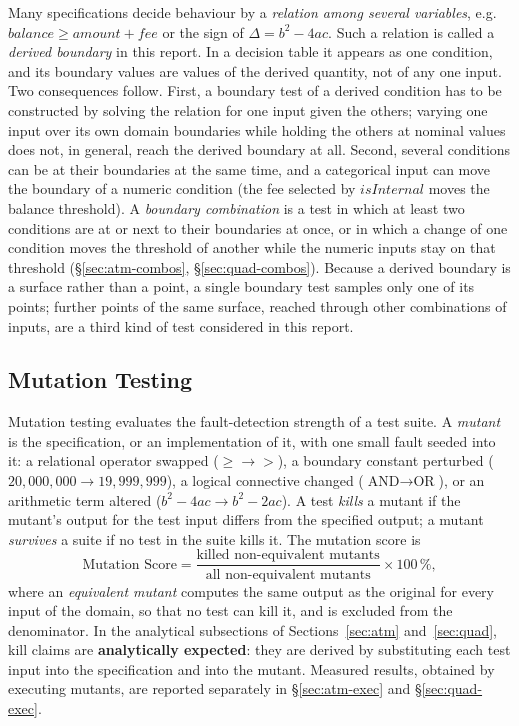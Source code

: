 \documentclass[11pt,a4paper]{article}
\begin{document}
Many specifications decide behaviour by a \emph{relation among several
variables}, e.g.\ \(\mathit{balance}\ge\mathit{amount}+\mathit{fee}\) or the
sign of \(\Delta=b^2-4ac\). Such a relation is called a \emph{derived
boundary} in this report. In a decision table it appears as one condition,
and its boundary values are values of the derived quantity, not of any one
input. Two consequences follow. First, a boundary test of a derived
condition has to be constructed by solving the relation for one input given
the others; varying one input over its own domain boundaries while holding
the others at nominal values does not, in general, reach the derived
boundary at all. Second, several conditions can be at their boundaries at
the same time, and a categorical input can move the boundary of a numeric
condition (the fee selected by \(\mathit{isInternal}\) moves the balance
threshold). A \emph{boundary combination} is a test in which at least two
conditions are at or next to their boundaries at once, or in which a change
of one condition moves the threshold of another while the numeric inputs
stay on that threshold (\S\ref{sec:atm-combos}, \S\ref{sec:quad-combos}).
Because a derived boundary is a surface rather than a point, a single
boundary test samples only one of its points; further points of the same
surface, reached through other combinations of inputs, are a third kind of
test considered in this report.

\subsection{Mutation Testing}
\label{sec:bg-mutation}

Mutation testing \cite{demillo1978,jia2011} evaluates the fault-detection
strength of a test suite. A \emph{mutant} is the specification, or an
implementation of it, with one small fault seeded into it: a relational
operator swapped (\(\ge\to>\)), a boundary constant perturbed
(\(20{,}000{,}000\to19{,}999{,}999\)), a logical connective changed
(\(\text{AND}\to\text{OR}\)), or an arithmetic term altered
(\(b^2-4ac\to b^2-2ac\)). A test \emph{kills} a mutant if the mutant's output
for the test input differs from the specified output; a mutant
\emph{survives} a suite if no test in the suite kills it. The mutation score
is
\[
\text{Mutation Score} = \frac{\text{killed non-equivalent mutants}}
{\text{all non-equivalent mutants}} \times 100\,\%,
\]
where an \emph{equivalent mutant} computes the same output as the original
for every input of the domain, so that no test can kill it, and is excluded
from the denominator. In the analytical subsections of
Sections~\ref{sec:atm} and~\ref{sec:quad}, kill claims are
\textbf{analytically expected}: they are derived by substituting each test
input into the specification and into the mutant. Measured results, obtained
by executing mutants, are reported separately in \S\ref{sec:atm-exec} and
\S\ref{sec:quad-exec}.
\end{document}
